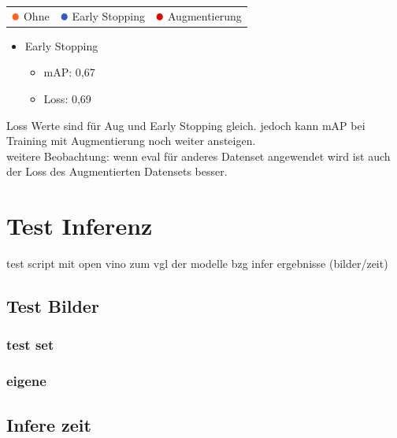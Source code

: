 
\begin{table}[htb]
  \centering
  \begin{tabular}{m{}<{\centering}m{}<{\centering}m{}<{\centering}}
    $\color[RGB]{255,100,30}\medbullet$  Ohne & $\color[RGB]{50,90,200}\medbullet$  Early Stopping & $\color[RGB]{220,10,0}\medbullet$  Augmentierung
  \end{tabular}    
\end{table}


\begin{itemize}
  \item Early Stopping
  \begin{itemize}
    \item mAP: 0,67
    \item Loss: 0,69
  \end{itemize}
\end{itemize}

Loss Werte sind für Aug und Early Stopping gleich. jedoch kann 
mAP bei Training mit Augmentierung noch weiter ansteigen.
\\
weitere Beobachtung: wenn eval für anderes Datenset 
angewendet wird ist auch der Loss des Augmentierten 
Datensets besser.




\section{Test Inferenz}
test script mit open vino zum vgl der modelle bzg infer ergebnisse (bilder/zeit)
\subsection{Test Bilder}
\subsubsection{test set}
\subsubsection{eigene}

\subsection{Infere zeit}

